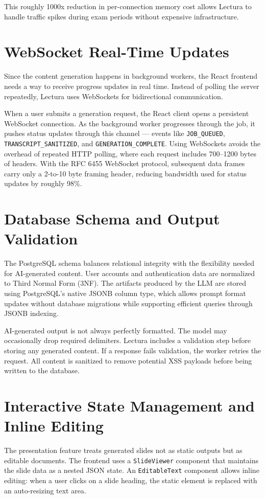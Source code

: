 This roughly 1000x reduction in per-connection memory cost allows Lectura to handle traffic spikes during exam periods without expensive infrastructure.

\section{WebSocket Real-Time Updates}
Since the content generation happens in background workers, the React frontend needs a way to receive progress updates in real time. Instead of polling the server repeatedly, Lectura uses WebSockets for bidirectional communication.

When a user submits a generation request, the React client opens a persistent WebSocket connection. As the background worker progresses through the job, it pushes status updates through this channel — events like \texttt{JOB\_QUEUED}, \texttt{TRANSCRIPT\_SANITIZED}, and \texttt{GENERATION\_COMPLETE}. Using WebSockets avoids the overhead of repeated HTTP polling, where each request includes 700--1200 bytes of headers. With the RFC 6455 WebSocket protocol, subsequent data frames carry only a 2-to-10 byte framing header, reducing bandwidth used for status updates by roughly 98\%.

\section{Database Schema and Output Validation}
The PostgreSQL schema balances relational integrity with the flexibility needed for AI-generated content. User accounts and authentication data are normalized to Third Normal Form (3NF). The artifacts produced by the LLM are stored using PostgreSQL's native JSONB column type, which allows prompt format updates without database migrations while supporting efficient queries through JSONB indexing.

AI-generated output is not always perfectly formatted. The model may occasionally drop required delimiters. Lectura includes a validation step before storing any generated content. If a response fails validation, the worker retries the request. All content is sanitized to remove potential XSS payloads before being written to the database.

\section{Interactive State Management and Inline Editing}
The presentation feature treats generated slides not as static outputs but as editable documents. The frontend uses a \texttt{SlideViewer} component that maintains the slide data as a nested JSON state. An \texttt{EditableText} component allows inline editing: when a user clicks on a slide heading, the static element is replaced with an auto-resizing text area.

